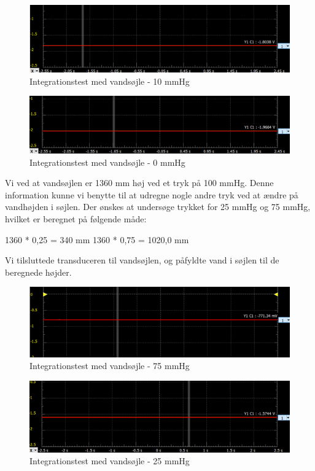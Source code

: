 \begin{figure}[h!]
	\centering
	\includegraphics[width=0.75\linewidth]{../Rapport/Implementering_og_test/Hardware/integration10mmhg}
	\caption{Integrationstest med vandsøjle - 10 mmHg}
	\label{fig:i10mmgh}
\end{figure}

\begin{figure}[h!]
	\centering
	\includegraphics[width=0.75\linewidth]{../Rapport/Implementering_og_test/Hardware/integration0mmhg}
	\caption{Integrationstest med vandsøjle - 0 mmHg}
	\label{fig:i0mmhg}
\end{figure}

\clearpage

Vi ved at vandsøjlen er 1360 mm høj ved et tryk på 100 mmHg. Denne information kunne vi benytte til at udregne nogle andre tryk ved at ændre på vandhøjden i søjlen.
Der ønskes at undersøge trykket for 25 mmHg og 75 mmHg, hvilket er beregnet på følgende måde:

1360 * 0,25 = 340 mm
1360 * 0,75 = 1020,0 mm

Vi tilsluttede transduceren til vandsøjlen, og påfyldte vand i søjlen til de beregnede højder.

\begin{figure}[h!]
	\centering
	\includegraphics[width=0.75\linewidth]{../Rapport/Implementering_og_test/Hardware/integration75mmhg}
	\caption{Integrationstest med vandsøjle - 75 mmHg}
	\label{fig:i75mmgh}
\end{figure}

\begin{figure}[h!]
	\centering
	\includegraphics[width=0.75\linewidth]{../Rapport/Implementering_og_test/Hardware/integration25mmhg}
	\caption{Integrationstest med vandsøjle - 25 mmHg}
	\label{fig:i25mmhg}
\end{figure}


